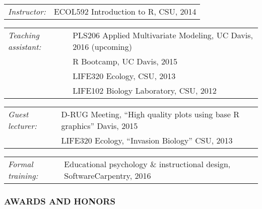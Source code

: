 \documentclass[11pt,english]{article}
\providecommand{\tabularnewline}{\\}
\begin{document}
\begin{hangparas}{.25in}{1}

\begin{tabular}{>{\raggedright}p{1.26in}>{\raggedright}p{4.75in}}
\emph{Instructor:} & ECOL592 Introduction to R, CSU, 2014
\end{tabular}

\begin{tabular}{>{\raggedright}p{1.26in}>{\raggedright}p{4.75in}}
\emph{Teaching assistant:} & PLS206 Applied Multivariate Modeling, UC Davis, 2016 (upcoming) \tabularnewline
& R Bootcamp, UC Davis, 2015 \tabularnewline
& LIFE320 Ecology, CSU, 2013 \tabularnewline 
& LIFE102 Biology Laboratory, CSU, 2012 \tabularnewline
\end{tabular}

\begin{tabular}{>{\raggedright}p{1.26in}>{\raggedright}p{4.75in}}
\emph{Guest lecturer:} & D-RUG Meeting, ``High quality plots using base R graphics'' Davis, 2015 \tabularnewline
& LIFE320 Ecology, ``Invasion Biology'' CSU, 2013
\end{tabular}

\begin{tabular}{>{\raggedright}p{1.26in}>{\raggedright}p{4.75in}}
\emph{Formal training:} & Educational psychology \& instructional design, SoftwareCarpentry, 2016
\end{tabular}

\end{hangparas}



\subsubsection*{AWARDS AND HONORS}
\vspace{-0.5ex}

\end{document}
